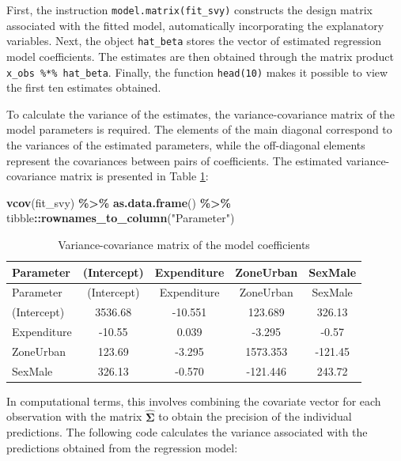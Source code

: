 \documentclass[
  english,
  12pt,
]{book}
\newenvironment{Shaded}{\begin{snugshade}}{\end{snugshade}}
\newcommand{\FunctionTok}[1]{\textcolor[rgb]{0.13,0.29,0.53}{\textbf{#1}}}
\newcommand{\NormalTok}[1]{#1}
\newcommand{\SpecialCharTok}[1]{\textcolor[rgb]{0.81,0.36,0.00}{\textbf{#1}}}
\newcommand{\StringTok}[1]{\textcolor[rgb]{0.31,0.60,0.02}{#1}}
\begin{document}
First, the instruction \texttt{model.matrix(fit\_svy)} constructs the design matrix associated with the fitted model, automatically incorporating the explanatory variables. Next, the object \texttt{hat\_beta} stores the vector of estimated regression model coefficients. The estimates are then obtained through the matrix product \texttt{x\_obs\ \%*\%\ hat\_beta}. Finally, the function \texttt{head(10)} makes it possible to view the first ten estimates obtained.

To calculate the variance of the estimates, the variance-covariance matrix of the model parameters is required. The elements of the main diagonal correspond to the variances of the estimated parameters, while the off-diagonal elements represent the covariances between pairs of coefficients. The estimated variance-covariance matrix is presented in Table \ref{tab:tab-vcov-modelo}:

\begin{Shaded}
\begin{Highlighting}[]
\FunctionTok{vcov}\NormalTok{(fit\_svy) }\SpecialCharTok{\%\textgreater{}\%}
  \FunctionTok{as.data.frame}\NormalTok{() }\SpecialCharTok{\%\textgreater{}\%}
\NormalTok{  tibble}\SpecialCharTok{::}\FunctionTok{rownames\_to\_column}\NormalTok{(}\StringTok{"Parameter"}\NormalTok{)}
\end{Highlighting}
\end{Shaded}

\begin{longtable}[]{@{}lcccc@{}}
\caption{\label{tab:tab-vcov-modelo}Variance-covariance matrix of the model coefficients}\tabularnewline
\toprule\noalign{}
Parameter & (Intercept) & Expenditure & ZoneUrban & SexMale \\
\midrule\noalign{}
\endfirsthead
\toprule\noalign{}
Parameter & (Intercept) & Expenditure & ZoneUrban & SexMale \\
\midrule\noalign{}
\endhead
\bottomrule\noalign{}
\endlastfoot
(Intercept) & 3536.68 & -10.551 & 123.689 & 326.13 \\
Expenditure & -10.55 & 0.039 & -3.295 & -0.57 \\
ZoneUrban & 123.69 & -3.295 & 1573.353 & -121.45 \\
SexMale & 326.13 & -0.570 & -121.446 & 243.72 \\
\end{longtable}

In computational terms, this involves combining the covariate vector for each observation with the matrix \(\hat{\boldsymbol{\Sigma}}\) to obtain the precision of the individual predictions. The following code calculates the variance associated with the predictions obtained from the regression model:
\end{document}
